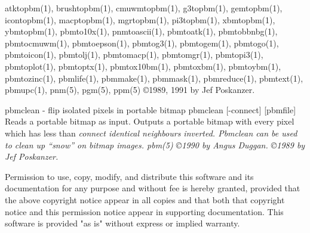 atktopbm(1), brushtopbm(1), cmuwmtopbm(1), g3topbm(1),
gemtopbm(1), icontopbm(1),
macptopbm(1), mgrtopbm(1), pi3topbm(1), xbmtopbm(1),
ybmtopbm(1),
pbmto10x(1), pnmtoascii(1), pbmtoatk(1), pbmtobbnbg(1),
pbmtocmuwm(1), pbmtoepson(1),
pbmtog3(1), pbmtogem(1), pbmtogo(1), pbmtoicon(1), pbmtolj(1),
pbmtomacp(1), pbmtomgr(1), pbmtopi3(1), pbmtoplot(1), pbmtoptx(1),
pbmtox10bm(1), pbmtoxbm(1), pbmtoybm(1),
pbmtozinc(1),
pbmlife(1), pbmmake(1), pbmmask(1), pbmreduce(1),
pbmtext(1), pbmupc(1),
pnm(5), pgm(5), ppm(5)
\copyright 1989, 1991 by Jef Poskanzer.
%
 
%

\newpage
%

pbmclean - flip isolated pixels in portable bitmap
pbmclean [-connect] [pbmfile]
Reads a portable bitmap as input. Outputs a portable bitmap with every 
pixel which has less than %
\it connect %
\rm identical neighbours inverted.
Pbmclean can be used to clean up ``snow'' on bitmap images.
pbm(5)
\copyright 1990 by Angus Duggan.
\copyright 1989 by Jef Poskanzer.

Permission to use, copy, modify, and distribute this software and its
documentation for any purpose and without fee is hereby granted, provided
that the above copyright notice appear in all copies and that both that
copyright notice and this permission notice appear in supporting
documentation.  This software is provided "as is" without express or
implied warranty.
%
 
